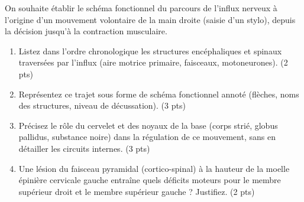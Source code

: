 \documentclass[11pt]{article}
\begin{document}
\begin{exercice}
On souhaite établir le schéma fonctionnel du parcours de l'influx nerveux à l'origine d'un mouvement volontaire de la main droite (saisie d'un stylo), depuis la décision jusqu'à la contraction musculaire.
\begin{enumerate}
    \item Listez dans l'ordre chronologique les structures encéphaliques et spinaux traversées par l'influx (aire motrice primaire, faisceaux, motoneurones). (2 pts)
    \item Représentez ce trajet sous forme de schéma fonctionnel annoté (flèches, noms des structures, niveau de décussation). (3 pts)
    \item Précisez le rôle du cervelet et des noyaux de la base (corps strié, globus pallidus, substance noire) dans la régulation de ce mouvement, sans en détailler les circuits internes. (3 pts)
    \item Une lésion du faisceau pyramidal (cortico-spinal) à la hauteur de la moelle épinière cervicale gauche entraîne quels déficits moteurs pour le membre supérieur droit et le membre supérieur gauche ? Justifiez. (2 pts)
\end{enumerate}
\end{exercice}
\end{document}
